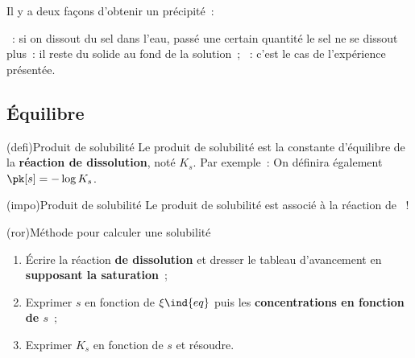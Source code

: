 \documentclass[../../main/main.tex]{subfiles}
\begin{document}
Il y a deux façons d'obtenir un précipité~:
\begin{enumerate}
	~: si on dissout du sel
	dans l'eau, passé une certain quantité le sel ne se dissout plus~: il reste
	du solide au fond de la solution~;
	~: c'est le cas de l'expérience présentée.
\end{enumerate}

\subsection{Équilibre}
\begin{tcb*}(defi){Produit de solubilité}
	Le produit de solubilité est la constante d'équilibre de la \textbf{réaction
		de dissolution}, noté $K_s$. Par exemple~:
	\vspace{-15pt}
	On définira également $\pk[s] = - \log K_s$.
\end{tcb*}

\begin{tcb*}(impo){Produit de solubilité}
	Le produit de solubilité est associé à la réaction de ~!
\end{tcb*}

\begin{tcb*}(ror){Méthode pour calculer une solubilité}
	\begin{enumerate}[label=\sqenumi]
		\item Écrire la réaction \textbf{de dissolution} et dresser le tableau
		      d'avancement en \textbf{supposant la saturation}~;
		\item Exprimer $s$ en fonction de $\xi\ind{eq}$ puis
		      les \textbf{concentrations en fonction de $s$}~;
		\item Exprimer $K_s$ en fonction de $s$ et résoudre.
	\end{enumerate}
\end{tcb*}
\end{document}
